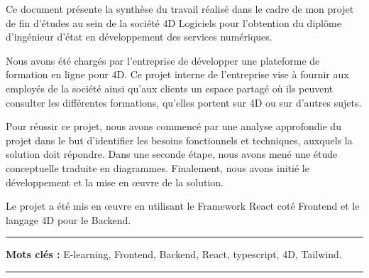 Ce document présente la synthèse du travail réalisé dans le cadre de mon projet de fin d’études au sein de la société 4D Logiciels pour l’obtention du diplôme d’ingénieur d’état en développement des services numériques.

\vspace{10pt}

Nous avons été chargés par l’entreprise de développer une plateforme de formation en ligne pour 4D. Ce projet interne de l’entreprise vise à fournir aux employés de la société ainsi qu'aux clients un espace partagé où ils peuvent consulter les différentes formations, qu’elles portent sur 4D ou sur d’autres sujets.

\vspace{10pt}

Pour réussir ce projet, nous avons commencé par une analyse approfondie du projet dans le but d’identifier les besoins fonctionnels et techniques, auxquels la solution doit répondre. Dans une seconde étape, nous avons mené une étude conceptuelle traduite en diagrammes. Finalement, nous avons initié le développement et la mise en œuvre de la solution.

\vspace{10pt}

Le projet a été mis en œuvre en utilisant le Framework React coté Frontend et le langage 4D pour le Backend.

\vspace{10pt}


\noindent\rule[2pt]{\textwidth}{0.5pt}

{\textbf{Mots clés :}}
E-learning, Frontend, Backend, React, typescript, 4D, Tailwind.
\\
\noindent\rule[2pt]{\textwidth}{0.5pt}
